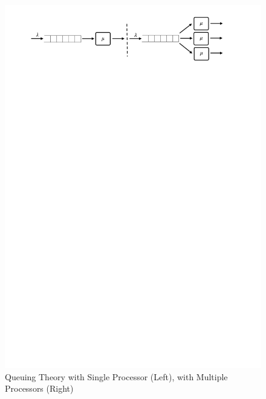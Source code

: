 \begin{figure}[!htbp]
    \centering
    \includegraphics[clip, trim=2cm 25cm 3cm 1cm]{queue.pdf}
    \caption[Queuing Theory]{Queuing Theory with Single Processor (Left), with Multiple Processors (Right)\footnotemark}
    \label{fig:queue}
\end{figure}

